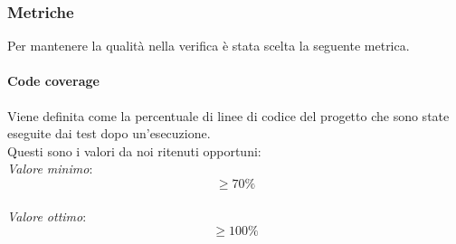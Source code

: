 \subsubsection{Metriche}
Per mantenere la qualità nella verifica è stata scelta la seguente metrica.
\paragraph{Code coverage}
Viene definita come la percentuale di linee di codice del progetto che sono state eseguite dai test dopo un'esecuzione.\\
Questi sono i valori da noi ritenuti opportuni:\\
\textit{Valore minimo}: $$ \geq 70\% $$\\
\textit{Valore ottimo}: $$ \geq 100\% $$\\